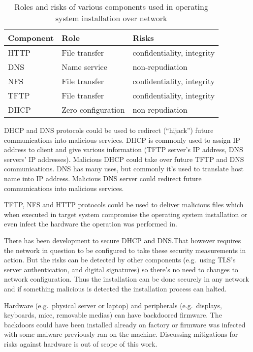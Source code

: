 \begin{table}[!ht]
  \def\arraystretch{1.1}%
  \begin{center}
    \begin{tabular}{| l | l | l |}
      \hline
      Component   & Role               & Risks                      \\
      \hline
      HTTP        & File transfer      & confidentiality, integrity \\
      DNS         & Name service       & non-repudiation            \\
      NFS         & File transfer      & confidentiality, integrity \\
      TFTP        & File transfer      & confidentiality, integrity \\
      DHCP        & Zero configuration & non-repudiation            \\
      \hline
    \end{tabular}
    \caption{Roles and risks of various components used in operating
      system installation over network\label{tab:risks_table}}
  \end{center}
\end{table}

DHCP and DNS protocols could be used to redirect (``hijack'') future
communications into malicious services. DHCP is commonly used to
assign IP address to client and give various information (TFTP
server's IP address, DNS servers' IP addresses). Malicious DHCP could
take over future TFTP and DNS communications. DNS has many uses, but
commonly it's used to translate host name into IP address. Malicious
DNS server could redirect future communications into malicious
services.

TFTP, NFS and HTTP protocols could be used to deliver malicious files
which when executed in target system compromise the operating system
installation or even infect the hardware the operation was performed
in.

There has been development to secure DHCP and DNS.\@ That however
requires the network in question to be configured to take these
security measurements in action. But the risks can be detected by
other components (e.g.\ using TLS's server authentication, and digital
signatures) so there's no need to changes to network
configuration. Thus the installation can be done securely in any
network and if something malicious is detected the installation
process can halted.

Hardware (e.g.\ physical server or laptop) and peripherals (e.g.\
displays, keyboards, mice, removable medias) can have backdoored
firmware. The backdoors could have been installed already on factory
or firmware was infected with some malware previously ran on the
machine. Discussing mitigations for risks against hardware is out of
scope of this work.


